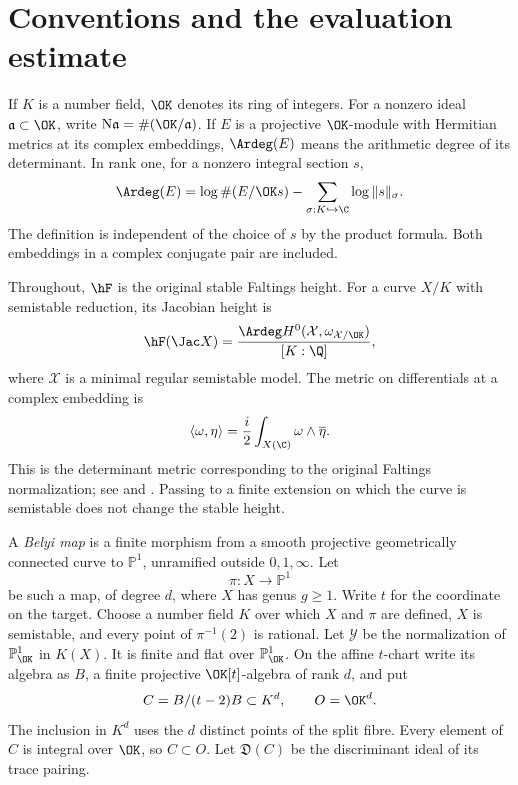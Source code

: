 \section{Conventions and the evaluation estimate}

If $K$ is a number field, $\OK$ denotes its ring of integers.
For a nonzero ideal $\mathfrak a\subset\OK$, write
$\mathrm N\mathfrak a=\#(\OK/\mathfrak a)$.
If $E$ is a projective $\OK$-module with Hermitian metrics at
its complex embeddings, $\Ardeg(E)$ means the arithmetic degree
of its determinant. In rank one, for a nonzero integral section $s$,
\[
 \Ardeg(E)=\log\#(E/\OK s)
                  -\sum_{\sigma:K\hookrightarrow\C}\log\|s\|_\sigma.
\]
The definition is independent of the choice of $s$ by the product
formula. Both embeddings in a complex conjugate pair are included.

Throughout, $\hF$ is the original stable Faltings height.
For a curve $X/K$ with semistable reduction, its Jacobian height is
\begin{equation}\label{eq:height-convention}
 \hF(\Jac X)=\frac{\Ardeg H^0(\mathcal X,
                                  \omega_{\mathcal X/\OK})}{[K:\Q]},
\end{equation}
where $\mathcal X$ is a minimal regular semistable model. The metric
on differentials at a complex embedding is
\[
 \langle\omega,\eta\rangle
       =\frac i2\int_{X(\C)}\omega\wedge\overline\eta.
\]
This is the determinant metric corresponding to the original Faltings
normalization; see \cite[Sections~2.1 and~2.3]{Javanpeykar} and
\cite[Section~2.1]{vonKaenel}. Passing to a finite extension on which
the curve is semistable does not change the stable height.

A \emph{Belyi map} is a finite morphism from a smooth projective
geometrically connected curve to $\mathbb P^1$, unramified outside
$0,1,\infty$. Let
\[
 \pi:X\longrightarrow\mathbb P^1
\]
be such a map, of degree $d$, where $X$ has genus $g\ge1$.
Write $t$ for the coordinate on the target.
Choose a number field $K$ over which $X$ and $\pi$ are defined,
$X$ is semistable, and every point of $\pi^{-1}(2)$ is rational.
Let $\mathcal Y$ be the normalization of $\mathbb P^1_{\OK}$ in
$K(X)$. It is finite and flat over $\mathbb P^1_{\OK}$.
On the affine $t$-chart write its algebra as $B$, a finite projective
$\OK[t]$-algebra of rank $d$, and put
\begin{equation}\label{eq:order}
 C=B/(t-2)B\subset K^d,
 \qquad O=\OK^d.
\end{equation}
The inclusion in $K^d$ uses the $d$ distinct points of the split
fibre. Every element of $C$ is integral over $\OK$, so $C\subset O$.
Let $\mathfrak D(C)$ be the discriminant ideal of its trace pairing.


